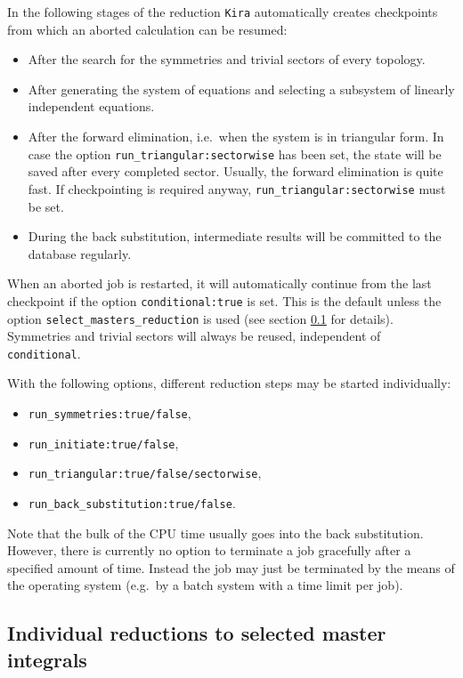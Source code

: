 \documentclass[a4paper,12pt]{article}
\newcommand*{\kira}{\texttt{Kira}}
\begin{document}
In the following stages of the reduction \kira{} automatically creates
checkpoints from which an aborted calculation can be resumed:
%
\begin{itemize}
  \item After the search for the symmetries and trivial sectors of every
    topology.
  \item After generating the system of equations and selecting a subsystem
    of linearly independent equations.
  \item After the forward elimination, i.e.\ when the system is in triangular
    form.
    In case the option \texttt{run\_triangular:\;sectorwise} has been set, the
    state will be saved after every completed sector.
    Usually, the forward elimination is quite fast.
    If checkpointing is required anyway, \texttt{run\_triangular:\;sectorwise}
    must be set.
  \item During the back substitution, intermediate results will be committed to
    the database regularly.
\end{itemize}
%
When an aborted job is restarted, it will automatically continue from the last
checkpoint if the option \texttt{conditional:\;true} is set.
This is the default unless the option \texttt{select\_masters\_reduction} is
used (see section \ref{subsec:reduct2individual} for details).
Symmetries and trivial sectors will always be reused, independent of
\texttt{conditional}.

With the following options, different reduction steps may be started
individually:
%
\begin{itemize}
  \item \texttt{run\_symmetries:\;true/false},
  \item \texttt{run\_initiate:\;true/false},
  \item \texttt{run\_triangular:\;true/false/sectorwise},
  \item \texttt{run\_back\_substitution:\;true/false}.
\end{itemize}
%
Note that the bulk of the CPU time usually goes into the back substitution.
However, there is currently no option to terminate a job gracefully after a
specified amount of time.
Instead the job may just be terminated by the means of the operating system
(e.g.\ by a batch system with a time limit per job).


\subsection{Individual reductions to selected master integrals}
\label{subsec:reduct2individual}
\end{document}

